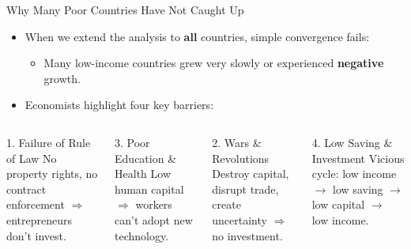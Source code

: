 \documentclass[aspectratio=169]{beamer}
\begin{document}
\begin{frame}{Why Many Poor Countries Have Not Caught Up}
\transfade
\begin{itemize}
  \item When we extend the analysis to \textbf{all} countries, simple convergence fails:
  \begin{itemize}
    \item Many low-income countries grew very slowly or experienced \textbf{negative} growth.
  \end{itemize}
  \item Economists highlight four key barriers:
\end{itemize}
\begin{columns}
\begin{block}{\textcolor{canadared}{1. Failure of Rule of Law}}
No property rights, no contract enforcement $\Rightarrow$ entrepreneurs don't invest.
\end{block}
\begin{block}{\textcolor{deeporange}{3. Poor Education \& Health}}
Low human capital $\Rightarrow$ workers can't adopt new technology.
\end{block}
\begin{block}{\textcolor{shiftpurple}{2. Wars \& Revolutions}}
Destroy capital, disrupt trade, create uncertainty $\Rightarrow$ no investment.
\end{block}
\begin{block}{\textcolor{tealblue}{4. Low Saving \& Investment}}
Vicious cycle: low income $\to$ low saving $\to$ low capital $\to$ low income.
\end{block}
\end{columns}
\end{frame}
\end{document}
